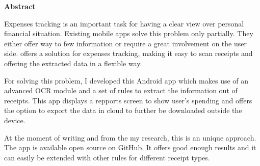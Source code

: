 \begin{center}
  \vspace*{\abstractTop}
  \huge
  \textbf{Abstract}
  \vspace*{\abstractBottom}
\end{center}

\normalsize

Expenses tracking is an important task for having a clear view over personal financial situation. Existing mobile apps solve this problem only partially. They either offer way to few information or require a great involvement on the user side. \AppName{} offers a solution for expenses tracking, making it easy to scan receipts and offering the extracted data in a flexible way.

For solving this problem, I developed this Android app which makes use of an advanced OCR module and a set of rules to extract the information out of receipts. This app displays a repports screen to show user's spending and offers the option to export the data in cloud to further be downloaded outside the device.

At the moment of writing and from the my research, this is an unique approach. The app is available open source on GitHub. It offers good enough results and it can easily be extended with other rules for different receipt types.

\clearpage
